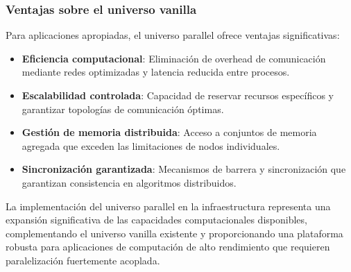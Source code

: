 \subsubsection{Ventajas sobre el universo vanilla}
\noindent

Para aplicaciones apropiadas, el universo parallel ofrece ventajas significativas:

\begin{itemize}
	\item \textbf{Eficiencia computacional}: Eliminación de overhead de comunicación mediante redes optimizadas y latencia reducida entre procesos.
	
	\item \textbf{Escalabilidad controlada}: Capacidad de reservar recursos específicos y garantizar topologías de comunicación óptimas.
	
	\item \textbf{Gestión de memoria distribuida}: Acceso a conjuntos de memoria agregada que exceden las limitaciones de nodos individuales.
	
	\item \textbf{Sincronización garantizada}: Mecanismos de barrera y sincronización que garantizan consistencia en algoritmos distribuidos.
\end{itemize}

La implementación del universo parallel en la infraestructura \GRID representa una expansión significativa de las capacidades computacionales disponibles, complementando el universo vanilla existente y proporcionando una plataforma robusta para aplicaciones de computación de alto rendimiento que requieren paralelización fuertemente acoplada.
